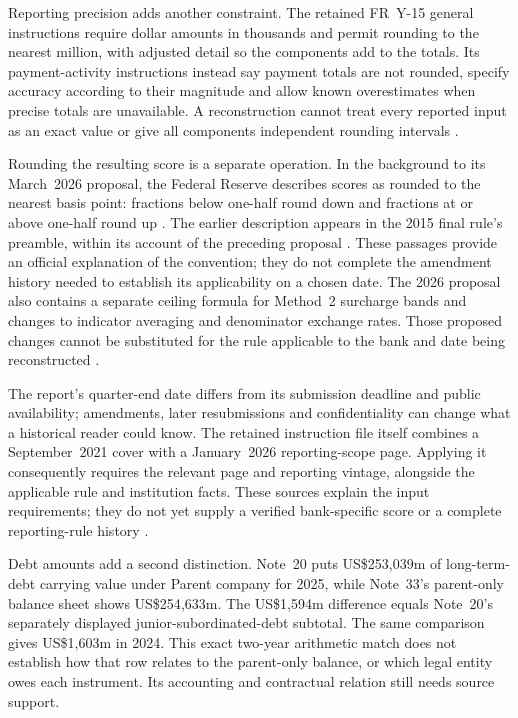 Reporting precision adds another constraint. The retained FR~Y-15 general
instructions require dollar amounts in thousands and permit rounding to the
nearest million, with adjusted detail so the components add to the totals.
Its payment-activity instructions instead say payment totals are not rounded,
specify accuracy according to their magnitude and allow known overestimates
when precise totals are unavailable. A reconstruction cannot treat every
reported input as an exact value or give all components independent rounding
intervals
\citep[GEN-3--4 and C-1; physical pp.~7--8, 25]{fry15instructionsretained2026}.

Rounding the resulting score is a separate operation. In the background to
its March~2026 proposal, the Federal Reserve describes scores as rounded to
the nearest basis point: fractions below one-half round down and fractions
at or above one-half round up
\citep[p.~14909, n.~9]{fedgsibproposal2026}.
The earlier description appears in the 2015 final rule's preamble, within
its account of the preceding proposal
\citep[p.~49084, n.~22]{fedgsibfinal2015}.
These passages provide an official explanation of the convention; they do
not complete the amendment history needed to establish its applicability
on a chosen date. The 2026 proposal also contains a separate ceiling formula
for Method~2 surcharge bands and changes to indicator averaging and
denominator exchange rates. Those proposed changes cannot be substituted
for the rule applicable to the bank and date being reconstructed
\citep[pp.~14917--14922]{fedgsibproposal2026}.

\begin{samepage}
The report's quarter-end date differs from its submission deadline and public
availability; amendments, later resubmissions and confidentiality can change
what a historical reader could know. The retained instruction file itself
combines a September~2021 cover with a January~2026 reporting-scope page.
Applying it consequently requires the relevant page and reporting vintage,
alongside the applicable rule and institution facts. These sources explain
the input requirements; they do not yet supply a verified bank-specific score
or a complete reporting-rule history
\citep[cover and GEN-1--5; physical pp.~1, 5--9]{fry15instructionsretained2026}.
\par
\end{samepage}


Debt amounts add a second distinction. Note~20 puts US\$253{,}039m of
long-term-debt carrying value under Parent company for 2025, while Note~33's
parent-only balance sheet shows US\$254{,}633m. The US\$1{,}594m difference
equals Note~20's separately displayed junior-subordinated-debt subtotal. The
same comparison gives US\$1{,}603m in 2024. This exact two-year arithmetic
match does not establish how that row relates to the parent-only balance,
or which legal entity owes each instrument. Its accounting and
contractual relation still needs source support.

